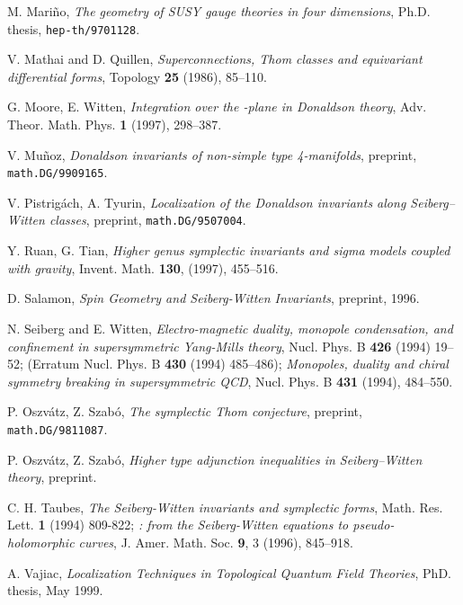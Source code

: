 \documentclass[a4paper,12pt,reqno,sumlimits]{amsart}
\theoremstyle{plain}
\theoremstyle{definition}
\providecommand{\1}{{\bf 1}}
\numberwithin{equation}{section}
\begin{document}
\begin{thebibliography}{999}
 M. Mari\~no, {\em The geometry of SUSY gauge theories in four
    dimensions}, Ph.D. thesis, \texttt{hep-th/9701128}.
  
 V. Mathai and D. Quillen, {\em Superconnections, Thom classes
    and equivariant differential forms}, Topology {\bf 25} (1986), 85--110.
  
 G. Moore, E. Witten, {\em Integration over the \coordHE{}-plane in
    Donaldson theory}, Adv. Theor. Math. Phys. {\bf 1} (1997), 298--387.
  
 V. Mu\~noz, {\em Donaldson invariants of non-simple type
    4-manifolds}, preprint, \texttt{math.DG/9909165}.
  
 V. Pistrig\'ach, A. Tyurin, {\em Localization of the Donaldson
    invariants along Seiberg--Witten classes}, preprint,
  \texttt{math.DG/9507004}.
  
 Y. Ruan, G. Tian, {\em Higher genus symplectic invariants
    and sigma models coupled with gravity}, Invent. Math. {\bf 130}, (1997),
  455--516.
  
 D. Salamon, {\em Spin Geometry and Seiberg-Witten
    Invariants}, preprint, 1996.
  
 N. Seiberg and E. Witten, {\em Electro-magnetic duality,
    monopole condensation, and confinement in \coordHE{} supersymmetric Yang-Mills
    theory}, Nucl. Phys. B {\bf 426} (1994) 19--52; (Erratum Nucl. Phys. B
  {\bf 430} (1994) 485--486); {\em Monopoles, duality and chiral symmetry
    breaking in \coordHE{} supersymmetric QCD}, Nucl. Phys. B {\bf 431} (1994),
  484--550.
  
 P. Oszv\'atz, Z. Szab\'o, {\em The symplectic Thom conjecture},
  preprint, \texttt{math.DG/9811087}.
  
 P. Oszv\'atz, Z. Szab\'o, {\em Higher type adjunction
    inequalities in Seiberg--Witten theory}, preprint.
  
 C. H. Taubes, {\em The Seiberg-Witten invariants and
    symplectic forms}, Math. Res. Lett. {\bf 1} (1994) 809-822; {\em {}\coordHE{}: from the Seiberg-Witten equations to
    pseudo-holomorphic curves}, J. Amer. Math. Soc. {\bf 9}, 3 (1996),
  845--918.
  
 A. Vajiac, {\em Localization Techniques in Topological
    Quantum Field Theories}, PhD. thesis, May 1999.


\end{thebibliography}
\end{document}
